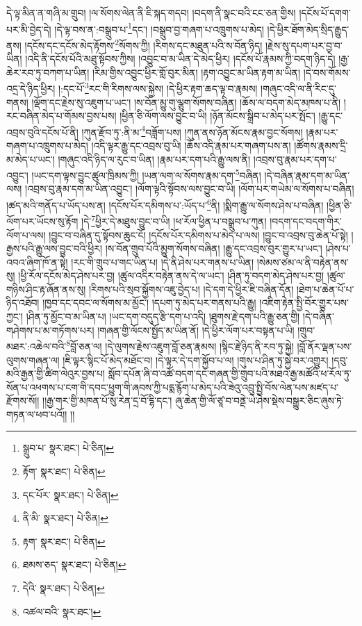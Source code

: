 དེ་ལྟ་མིན་ན་གཞི་མ་གྲུབ། །ལ་སོགས་ལེན་ནི་ཇི་སྐད་གདབ། །བདག་ནི་སྣང་བའི་ངང་ཅན་གྱིས། །དངོས་པོ་དགག་པར་མི་བྱེད་དེ། །དེ་ལྟ་བས་ན་:བསྒྲུབ་པ་\footnote{སྒྲུབ་པ་  སྣར་ཐང་།  པེ་ཅིན། }དང་། །བསྒྲུབ་བྱ་གཞག་པ་འཁྲུགས་པ་མེད། །དེ་ཕྱིར་ཐོག་མེད་སྲིད་རྒྱུད་ནས། །དངོས་དང་དངོས་མེད་རྟོགས་\footnote{རྟོག་  སྣར་ཐང་།  པེ་ཅིན། }སོགས་ཀྱི། །རིགས་དང་མཐུན་པའི་ས་བོན་ཉིད། །རྗེས་སུ་དཔག་པར་བྱ་བ་ཡིན། །འདི་ནི་དངོས་པོའི་མཐུ་སྟོབས་ཀྱིས། །འབྱུང་བ་མ་ཡིན་དེ་མེད་ཕྱིར། །དངོས་པོ་རྣམས་ཀྱི་བདག་ཉིད་དེ། །རྒྱ་ཆེར་རབ་ཏུ་བཀག་པ་ཡིན། །རིམ་གྱིས་འབྱུང་ཕྱིར་གློ་བུར་མིན། །རྟག་འབྱུང་མ་ཡིན་རྟག་མ་ཡིན། །དེ་བས་གོམས་འདྲ་དེ་ཉིད་ཕྱིར། །:དང་པོ་\footnote{དང་པོར་  སྣར་ཐང་།  པེ་ཅིན། }རང་གི་རིགས་ལས་སྐྱེས། །དེ་ཕྱིར་རྟག་ཆད་ལྟ་བ་རྣམས། །གཞུང་འདི་ལ་ནི་རིང་དུ་གནས། །ལྡོག་དང་རྗེས་སུ་འཇུག་པ་ཡང་། །ས་བོན་མྱུ་གུ་ལྕུག་སོགས་བཞིན། །ཆོས་ལ་བདག་མེད་མཁས་པ་ནི། །རང་བཞིན་མེད་པ་གོམས་བྱས་པས། །ཕྱིན་ཅི་ལོག་ལས་བྱུང་བ་ཡི། །ཉོན་མོངས་སྒྲིབ་པ་མེད་པར་སྤོང་། །རྒྱུ་དང་འབྲས་བུའི་དངོས་པོ་ནི། །ཀུན་རྫོབ་ཏུ་:ནི་མ་\footnote{ནི་མི་  སྣར་ཐང་།  པེ་ཅིན། }བཟློག་པས། །ཀུན་ནས་ཉོན་མོངས་རྣམ་བྱང་སོགས། །རྣམ་པར་གཞག་པ་འཁྲུགས་པ་མེད། །འདི་ལྟར་རྒྱུ་དང་འབྲས་བུ་ཡི། །ཆོས་འདི་རྣམ་པར་གཞག་པས་ན། །ཚོགས་རྣམས་དྲི་མ་མེད་པ་ཡང་། །གཞུང་འདི་ཉིད་ལ་རུང་བ་ཡིན། །རྣམ་པར་དག་པའི་རྒྱུ་ལས་ནི། །འབྲས་བུ་རྣམ་པར་དག་པ་འབྱུང་། །ཡང་དག་ལྟས་བྱུང་ཚུལ་ཁྲིམས་ཀྱི། །ཡན་ལག་ལ་སོགས་རྣམ་དག་\footnote{རྟག་  སྣར་ཐང་།  པེ་ཅིན། }བཞིན། །དེ་བཞིན་རྣམ་དག་མ་ཡིན་ལས། །འབྲས་བུ་རྣམ་དག་མ་ཡིན་འབྱུང་། །ལོག་ལྟའི་སྟོབས་ལས་བྱུང་བ་ཡི། །ལོག་པར་གཡེམ་ལ་སོགས་པ་བཞིན། །ཚད་མའི་གནོད་པ་ཡོད་པས་ན། །དངོས་པོར་དམིགས་པ་:ཡོད་པ་\footnote{ཐམས་ཅད་  སྣར་ཐང་།  པེ་ཅིན། }ནི། །སྨིག་རྒྱུ་ལ་སོགས་ཤེས་པ་བཞིན། །ཕྱིན་ཅི་ལོག་པར་ཡོངས་སུ་རྟོག །དེ་\footnote{དེའི་  སྣར་ཐང་།  པེ་ཅིན། }ཕྱིར་དེ་མཐུས་བྱུང་བ་ཡི། །ཕ་རོལ་ཕྱིན་པ་བསྒྲུབ་པ་ཀུན། །བདག་དང་བདག་གིར་ལོག་པ་ལས། །བྱུང་བ་བཞིན་དུ་སྟོབས་ཆུང་ངོ། །དངོས་པོར་དམིགས་པ་མེད་པ་ལས། །བྱུང་བ་འབྲས་བུ་ཆེན་པོ་སྟེ། །
རྒྱས་པའི་རྒྱུ་ལས་བྱུང་བའི་ཕྱིར། །ས་བོན་གྲུབ་པོའི་མྱུག་སོགས་བཞིན། །རྒྱུ་དང་འབྲས་བུར་གྱུར་པ་ཡང་། །ཤེས་པ་འབའ་ཞིག་ཁོ་ན་སྟེ། །རང་གི་གྲུབ་པ་གང་ཡིན་པ། །དེ་ནི་ཤེས་པར་གནས་པ་ཡིན། །སེམས་ཙམ་ལ་ནི་བརྟེན་ནས་སུ། །ཕྱི་རོལ་དངོས་མེད་ཤེས་པར་བྱ། །ཚུལ་འདིར་བརྟེན་ནས་དེ་ལ་ཡང་། །ཤིན་ཏུ་བདག་མེད་ཤེས་པར་བྱ། །ཚུལ་གཉིས་ཤིང་རྟ་ཞོན་ནས་སུ། །རིགས་པའི་སྲབ་སྐྱོགས་འཇུ་བྱེད་པ། །དེ་དག་དེ་ཕྱིར་ཇི་བཞིན་དོན། །ཐེག་པ་ཆེན་པོ་པ་ཉིད་འཐོབ། །ཁྱབ་དང་དབང་ལ་སོགས་མ་མྱོང་། །དཔག་ཏུ་མེད་པར་གནས་པའི་རྒྱུ། །འཇིག་རྟེན་སྤྱི་བོར་གྱུར་པས་ཀྱང་། །ཤིན་ཏུ་མྱོང་བ་མ་ཡིན་པ། །ཡང་དག་བདུད་རྩི་དག་པ་འདི། །ཐུགས་རྗེ་དག་པའི་རྒྱུ་ཅན་གྱི། །དེ་བཞིན་གཤེགས་པ་མ་གཏོགས་པར། །གཞན་གྱི་ལོངས་སྤྱོད་མ་ཡིན་ནོ། །དེ་ཕྱིར་ལོག་པར་བསྟན་པ་ཡི། །གྲུབ་མཐར་:འཆེལ་བའི་\footnote{འཚལ་བའི་  སྣར་ཐང་། }བློ་ཅན་ལ། །དེ་ལུགས་རྗེས་འཇུག་བློ་ཅན་རྣམས། །སྙིང་རྗེ་ཉིད་ནི་རབ་ཏུ་སྐྱེ། །བློ་ནོར་ལྡན་པས་ལུགས་གཞན་ལ། །ཇི་ལྟར་སྙིང་པོ་མེད་མཐོང་བ། །དེ་ལྟར་དེ་དག་སྐྱོབ་པ་ལ། །གུས་པ་ཤིན་ཏུ་སྐྱེ་བར་འགྱུར། །དབུ་མའི་རྒྱན་གྱི་ཚིག་ལེའུར་བྱས་པ། སློབ་དཔོན་ཞི་བ་འཚོ་བདག་དང་གཞན་གྱི་གྲུབ་པའི་མཐའ་རྒྱ་མཚོའི་ཕ་རོལ་ཏུ་སོན་པ་འཕགས་པ་ངག་གི་དབང་ཕྱུག་གི་ཞབས་ཀྱི་པདྨ་རྙོག་པ་མེད་པའི་ཟེའུ་འབྲུ་སྤྱི་བོས་ལེན་པས་མཛད་པ་རྫོགས་སོ།། །།རྒྱ་གར་གྱི་མཁན་པོ་སུ་རེན་དྲ་བོ་དྷི་དང་། ཞུ་ཆེན་གྱི་ལོ་ཙཱ་བ་བནྡེ་ཡེ་ཤེས་སྡེས་བསྒྱུར་ཅིང་ཞུས་ཏེ་གཏན་ལ་ཕབ་པའོ།། །།